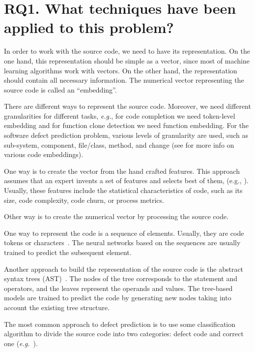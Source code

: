 \documentclass[mathematics,review,submit,moreauthors,pdftex]{Definitions/mdpi}
\begin{document}
\section{RQ1. What techniques have been applied to this problem?}\label{sec_3}

In order to work with the source code, we need to have its representation.
On the one hand, this representation should be simple as a vector, since most of machine learning algorithms work with vectors.
On the other hand, the representation should contain all necessary information. 
The numerical vector representing the source code is called an ``embedding''.

There are different ways to represent the source code. Moreover, we need different granularities for different tasks, \textit{e.g.}, for code completion we need token-level embedding and for function clone detection we need function embedding. For the software defect prediction problem, various levels of granularity are used, such as sub-system, component, file/class, method, and change (see \cite{AllamanisEtAl2018,ChenMonperrus2019} for more info on various code embeddings).

One way is to create the vector from the hand crafted features.
This approach assumes that an expert invents a set of features and selects best of them, (e.g., \cite{SharminEtAl2015,DamEtAl2018}).
Usually, these features include the statistical characteristics of code, such as its size, code complexity, code churn, or process metrics.

Other way is to create the numerical vector by processing the source code.

One way to represent the code is a sequence of elements. Usually, they are code tokens or characters~\cite{MikolovEtAl2013}. The neural networks based on the sequences are usually trained to predict the subsequent element.

Another approach to build the representation of the source code is the abstract syntax trees (AST)~\cite{ZhangEtAl2019}. The nodes of the tree corresponds to the statement and operators, and the leaves represent the operands and values. The tree-based models are trained to predict the code by generating new nodes taking into account the existing tree structure. 

The most common approach to defect prediction is to use some classification algorithm to divide the source code into two categories: defect code and correct one (\textit{e.g.}~\cite{PradelSen2018}).
\end{document}
